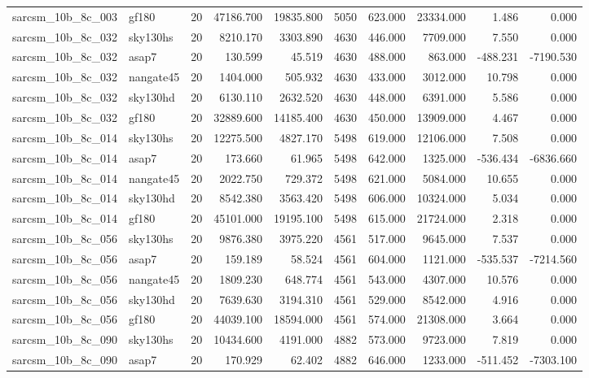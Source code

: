 \begin{tabular}{llrrrrrrrr}
sarcsm\_10b\_8c\_003 & gf180 & 20 & 47186.700 & 19835.800 & 5050 & 623.000 & 23334.000 & 1.486 & 0.000 \\
sarcsm\_10b\_8c\_032 & sky130hs & 20 & 8210.170 & 3303.890 & 4630 & 446.000 & 7709.000 & 7.550 & 0.000 \\
sarcsm\_10b\_8c\_032 & asap7 & 20 & 130.599 & 45.519 & 4630 & 488.000 & 863.000 & -488.231 & -7190.530 \\
sarcsm\_10b\_8c\_032 & nangate45 & 20 & 1404.000 & 505.932 & 4630 & 433.000 & 3012.000 & 10.798 & 0.000 \\
sarcsm\_10b\_8c\_032 & sky130hd & 20 & 6130.110 & 2632.520 & 4630 & 448.000 & 6391.000 & 5.586 & 0.000 \\
sarcsm\_10b\_8c\_032 & gf180 & 20 & 32889.600 & 14185.400 & 4630 & 450.000 & 13909.000 & 4.467 & 0.000 \\
sarcsm\_10b\_8c\_014 & sky130hs & 20 & 12275.500 & 4827.170 & 5498 & 619.000 & 12106.000 & 7.508 & 0.000 \\
sarcsm\_10b\_8c\_014 & asap7 & 20 & 173.660 & 61.965 & 5498 & 642.000 & 1325.000 & -536.434 & -6836.660 \\
sarcsm\_10b\_8c\_014 & nangate45 & 20 & 2022.750 & 729.372 & 5498 & 621.000 & 5084.000 & 10.655 & 0.000 \\
sarcsm\_10b\_8c\_014 & sky130hd & 20 & 8542.380 & 3563.420 & 5498 & 606.000 & 10324.000 & 5.034 & 0.000 \\
sarcsm\_10b\_8c\_014 & gf180 & 20 & 45101.000 & 19195.100 & 5498 & 615.000 & 21724.000 & 2.318 & 0.000 \\
sarcsm\_10b\_8c\_056 & sky130hs & 20 & 9876.380 & 3975.220 & 4561 & 517.000 & 9645.000 & 7.537 & 0.000 \\
sarcsm\_10b\_8c\_056 & asap7 & 20 & 159.189 & 58.524 & 4561 & 604.000 & 1121.000 & -535.537 & -7214.560 \\
sarcsm\_10b\_8c\_056 & nangate45 & 20 & 1809.230 & 648.774 & 4561 & 543.000 & 4307.000 & 10.576 & 0.000 \\
sarcsm\_10b\_8c\_056 & sky130hd & 20 & 7639.630 & 3194.310 & 4561 & 529.000 & 8542.000 & 4.916 & 0.000 \\
sarcsm\_10b\_8c\_056 & gf180 & 20 & 44039.100 & 18594.000 & 4561 & 574.000 & 21308.000 & 3.664 & 0.000 \\
sarcsm\_10b\_8c\_090 & sky130hs & 20 & 10434.600 & 4191.000 & 4882 & 573.000 & 9723.000 & 7.819 & 0.000 \\
sarcsm\_10b\_8c\_090 & asap7 & 20 & 170.929 & 62.402 & 4882 & 646.000 & 1233.000 & -511.452 & -7303.100 \\

\end{tabular}
